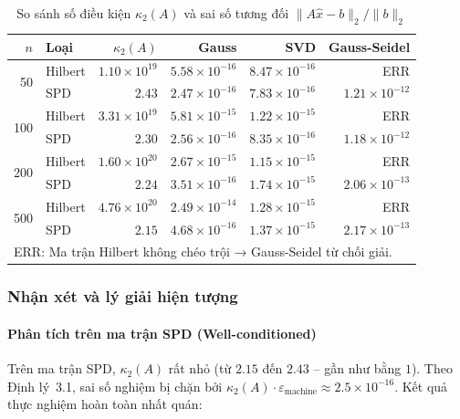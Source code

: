\begin{table}[h!]
\centering
\caption{So sánh số điều kiện $\kappa_2(A)$ và sai số tương đối $\|A\hat{x}-b\|_2/\|b\|_2$}
\label{tab:stability}
\begin{tabular}{|r|l|r|r|r|r|}
\hline
\textbf{$n$} & \textbf{Loại} & \textbf{$\kappa_2(A)$} & \textbf{Gauss} & \textbf{SVD} & \textbf{Gauss-Seidel} \\
\hline
\multirow{2}{*}{50}
  & Hilbert & $1.10 \times 10^{19}$ & $5.58 \times 10^{-16}$ & $8.47 \times 10^{-16}$ & ERR \\
  & SPD     & $2.43$               & $2.47 \times 10^{-16}$ & $7.83 \times 10^{-16}$ & $1.21 \times 10^{-12}$ \\
\hline
\multirow{2}{*}{100}
  & Hilbert & $3.31 \times 10^{19}$ & $5.81 \times 10^{-15}$ & $1.22 \times 10^{-15}$ & ERR \\
  & SPD     & $2.30$               & $2.56 \times 10^{-16}$ & $8.35 \times 10^{-16}$ & $1.18 \times 10^{-12}$ \\
\hline
\multirow{2}{*}{200}
  & Hilbert & $1.60 \times 10^{20}$ & $2.67 \times 10^{-15}$ & $1.15 \times 10^{-15}$ & ERR \\
  & SPD     & $2.24$               & $3.51 \times 10^{-16}$ & $1.74 \times 10^{-15}$ & $2.06 \times 10^{-13}$ \\
\hline
\multirow{2}{*}{500}
  & Hilbert & $4.76 \times 10^{20}$ & $2.49 \times 10^{-14}$ & $1.28 \times 10^{-15}$ & ERR \\
  & SPD     & $2.15$               & $4.68 \times 10^{-16}$ & $1.37 \times 10^{-15}$ & $2.17 \times 10^{-13}$ \\
\hline
\multicolumn{6}{l}{\footnotesize ERR: Ma trận Hilbert không chéo trội → Gauss-Seidel từ chối giải.} \\
\end{tabular}
\end{table}

\subsubsection{Nhận xét và lý giải hiện tượng}

\paragraph{Phân tích trên ma trận SPD (Well-conditioned)}

Trên ma trận SPD, $\kappa_2(A)$ rất nhỏ (từ $2.15$ đến $2.43$ -- gần như bằng $1$). Theo Định lý~3.1, sai số nghiệm bị chặn bởi $\kappa_2(A) \cdot \varepsilon_{\text{machine}} \approx 2.5 \times 10^{-16}$. Kết quả thực nghiệm hoàn toàn nhất quán:

